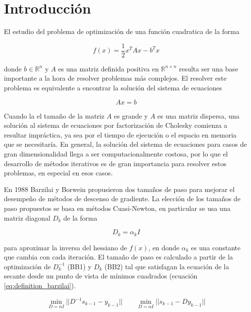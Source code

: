 \section*{Introducción}

\par El estudio del problema de optimización de una función cuadratica de la forma

\begin{equation}
    f(x) = \frac{1}{2}x^TAx- b^Tx \label{eq:quadratic_function}
\end{equation}

donde $b\in\mathbb{R}^n$ y $A$ es una matriz definida positiva  en $\mathbb{R}^{n\times n}$ resulta ser una base importante a la hora de resolver problemas más complejos. El resolver este problema es equivalente a encontrar la solución del sistema de ecuaciones

\begin{equation*}
    Ax=b
\end{equation*}

\par Cuando la el tamaño de la matriz $A$ es grande y $A$ es una matriz dispersa, una solución al sistema de ecuaciones por factorización de Cholesky comienza a resultar impráctica, ya sea por el tiempo de ejecución o el espacio en memoria que se necesitaría. En general, la solución del sistema de ecuaciones para casos de gran dimensionalidad llega a ser computacionalmente costosa, por lo que el desarrollo de métodos iterativos es de gran importancia para resolver estos problemas, en especial en esos casos.
\par En 1988 Barzilai y Borwein\cite{barzilai_1988} propusieron dos tamaños de paso para mejorar el desempeño de métodos de descenso de gradiente. La elección de los tamaños de paso propuestos se basa en métodos Cuasi-Newton, en particular se usa una matriz diagonal $D_k$ de la forma 

\begin{equation}
    D_k = \alpha_k \mathit{I}
\end{equation}

para aproximar la inversa del hessiano de $f(x)$, en donde $\alpha_k$ es una constante que cambia con cada iteración. El tamaño de paso es calculado a partir de la optimización de $D_k^{-1}$  (BB1) y  $D_k$ (BB2) tal que satisfagan la ecuación de la secante desde un punto de vista de mínimos cuadrados (ecuación \ref{eq:definition_barzilai}).

\begin{equation}
    \min_{D=\alpha \mathit{I}} ||D^{-1}s_{k-1}-y_{k-1}|| \qquad \min_{D=\alpha \mathit{I}} ||s_{k-1}-Dy_{k-1}|| \label{eq:definition_barzilai}
\end{equation}

